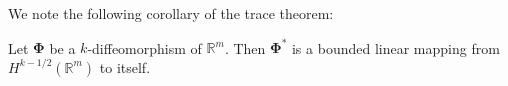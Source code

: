 We note the following corollary of the trace theorem:

\begin{Corollary}
\label{cor:fractional-order-diffeomorphism-pullback}
Let $\bm{\Phi}$ be a $k$-diffeomorphism of $\mathbb{R}^m$. Then $\bm{\Phi}^*$ is a bounded linear mapping from $H^{k-1/2}(\mathbb{R}^m)$ to itself.
\end{Corollary}

\begingroup
{}
\renewcommand{\endProof}{\par\nobreak\hfill$\blacksquare$\par\vspace{0.1cm}}
\endgroup
